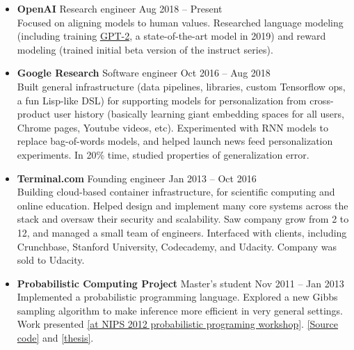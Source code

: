 \documentclass[11 pt]{article}
\begin{document}
\begin{itemize}

\item \textbf{OpenAI} Research engineer \hfill Aug 2018 -- Present \\
Focused on aligning models to human values.  Researched language modeling (including training \href{https://openai.com/blog/better-language-models/}{GPT-2}, a state-of-the-art model in 2019) and reward modeling (trained initial beta version of the instruct series).


\item \textbf{Google Research} Software engineer \hfill Oct 2016 -- Aug 2018 \\
Built general infrastructure (data pipelines, libraries, custom Tensorflow ops, a fun Lisp-like DSL) for supporting models for personalization from cross-product user history (basically learning giant embedding spaces for all users, Chrome pages, Youtube videos, etc).
Experimented with RNN models to replace bag-of-words models, and helped launch news feed personalization experiments.
In 20\% time, studied properties of generalization error.

\item \textbf{Terminal.com} Founding engineer \hfill Jan 2013 -- Oct 2016 \\
Building cloud-based container infrastructure, for scientific computing and online education.
Helped design and implement many core systems across the stack %
and oversaw their security and scalability.
Saw company grow from 2 to 12, and managed a small team of engineers.
Interfaced with clients, including Crunchbase, Stanford University, Codecademy, and Udacity.
Company was sold to Udacity.

\item \textbf{Probabilistic Computing Project} Master's student \hfill Nov 2011 -- Jan 2013 \\
Implemented a probabilistic programming language.
Explored a new Gibbs sampling algorithm to make inference more efficient in very general settings.
Work presented \href{http://probabilistic-programming.org/wiki/NIPS*2012_Workshop/Schedule#poster-wu}{[at NIPS 2012 probabilistic programing workshop]}.
\href{https://github.com/WuTheFWasThat/PyChurch.}{[Source code]}
and
\href{https://github.com/WuTheFWasThat/PyChurch/blob/master/papers/MEng\%20thesis.pdf}{[thesis]}.



\end{itemize}
\end{document}
